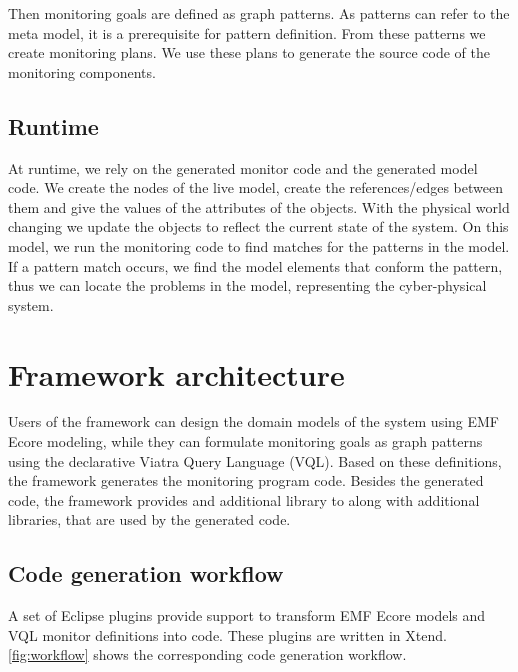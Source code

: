 Then monitoring goals are defined as graph patterns. 
As patterns can refer to the meta model, it is a prerequisite for pattern definition. 
From these patterns we create monitoring plans. 
We use these plans to generate the source code of the monitoring components.

\subsection{Runtime}

At runtime, we rely on the generated monitor code and the generated model code. 
We create the nodes of the live model, create the references/edges between them and give the values of the attributes of the objects. 
With the physical world changing we update the objects to reflect the current state of the system. 
On this model, we run the monitoring code to find matches for the patterns in the model. 
If a pattern match occurs, we find the model elements that conform the pattern, thus we can locate the problems in the model, representing the cyber-physical system.


\section{Framework architecture}

Users of the framework can design the domain models of the system using EMF Ecore modeling, while they can formulate monitoring goals as graph patterns using the declarative Viatra Query Language (VQL).
Based on these definitions, the framework generates the monitoring \cpp{} program code.
Besides the generated code, the framework provides and additional library to  along with additional libraries, that are used by the generated code. 

\subsection{Code generation workflow}
A set of Eclipse plugins provide support to transform EMF Ecore models and VQL monitor definitions into \cpp code. 
These plugins are written in Xtend. 
\autoref{fig:workflow} shows the corresponding code generation workflow.

